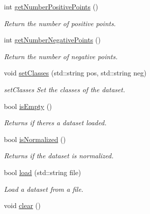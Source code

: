 \begin{DoxyCompactItemize}
int \hyperlink{class_data_a627911f72bc1ccc3a096b531772ccb8c}{get\+Number\+Positive\+Points} ()
\begin{DoxyCompactList}\small\item\em Return the number of positive points. \end{DoxyCompactList}\item 
int \hyperlink{class_data_a9494572e8a2bc92fb4c10087cf35e4be}{get\+Number\+Negative\+Points} ()
\begin{DoxyCompactList}\small\item\em Return the number of negative points. \end{DoxyCompactList}\item 
void \hyperlink{class_data_a6d29f9fc923c3f7c258b93330130f056}{set\+Classes} (std\+::string pos, std\+::string neg)
\begin{DoxyCompactList}\small\item\em set\+Classes Set the classes of the dataset. \end{DoxyCompactList}\item 
bool \hyperlink{class_data_a8b96bf083edf16dd41031c254d32e143}{is\+Empty} ()
\begin{DoxyCompactList}\small\item\em Returns if there\textquotesingle{}s a dataset loaded. \end{DoxyCompactList}\item 
bool \hyperlink{class_data_a6b91ca6585e8638f1b359a6f2bb827d7}{is\+Normalized} ()
\begin{DoxyCompactList}\small\item\em Returns if the dataset is normalized. \end{DoxyCompactList}\item 
bool \hyperlink{class_data_a1d15d02eb38c6fb9ebf5d29ecafe7eee}{load} (std\+::string file)
\begin{DoxyCompactList}\small\item\em Load a dataset from a file. \end{DoxyCompactList}\item 
void \hyperlink{class_data_a3fc15f7a8c270b72af86951d6955608d}{clear} ()\hypertarget{class_data_a3fc15f7a8c270b72af86951d6955608d}{}\label{class_data_a3fc15f7a8c270b72af86951d6955608d}


\end{DoxyCompactItemize}
